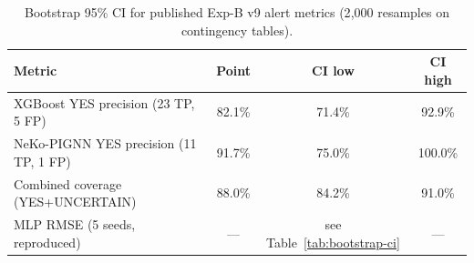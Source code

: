 \begin{table}[htbp]
\centering
\caption{Bootstrap 95\% CI for published Exp-B v9 alert metrics (2{,}000 resamples on contingency tables).}
\label{tab:bootstrap-v9}
\small
\begin{tabular}{@{}lccc@{}}
\toprule
\textbf{Metric} & \textbf{Point} & \textbf{CI low} & \textbf{CI high} \\
\midrule
XGBoost YES precision (23 TP, 5 FP) & 82.1\% & 71.4\% & 92.9\% \\
NeKo-PIGNN YES precision (11 TP, 1 FP) & 91.7\% & 75.0\% & 100.0\% \\
Combined coverage (YES+UNCERTAIN) & 88.0\% & 84.2\% & 91.0\% \\
\midrule
MLP RMSE (5 seeds, reproduced) & --- & see Table~\ref{tab:bootstrap-ci} & --- \\
\bottomrule
\end{tabular}
\end{table}
